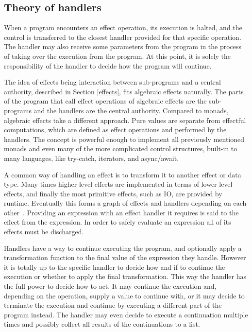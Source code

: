 \subsection{Theory of handlers}
When a program encounters an effect operation, its execution is halted, and the control is transferred to the closest handler provided for that specific operation. The handler may also receive some parameters from the program in the process of taking over the execution from the program. At this point, it is solely the responsibility of the handler to decide how the program will continue.

The idea of effects being interaction between sub-programs and a central authority, described in Section \ref{effects}, fits algebraic effects naturally. The parts of the program that call effect operations of algebraic effects are the sub-programs and the handlers are the central authority. Compared to monads, algebraic effects take a different approach. Pure values are separate from effectful computations, which are defined as effect operations and performed by the handlers. The concept is powerful enough to implement all previously mentioned monads and even many of the more complicated control structures, built-in to many languages, like try-catch, iterators, and async/await.~\cite{alg-effs-for-fp}

A common way of handling an effect is to transform it to another effect or data type. Many times higher-level effects are implemented in terms of lower level effects, and finally the most primitive effects, such as IO, are provided by runtime. Eventually this forms a graph of effects and handlers depending on each other~\cite{intro-to-alg-eff}. Providing an expression with an effect handler it requires is said to  the effect from the expression. In order to safely evaluate an expression all of its effects must be discharged.

Handlers have a way to continue executing the program, and optionally apply a transformation function to the final value of the expression they handle. However it is totally up to the specific handler to decide how and if to continue the execution or whether to apply the final transformation. This way the handler has the full power to decide how to act. It may continue the execution and, depending on the operation, supply a value to continue with, or it may decide to terminate the execution and continue by executing a different part of the program instead. The handler may even decide to execute a continuation multiple times and possibly collect all results of the continuations to a list.

